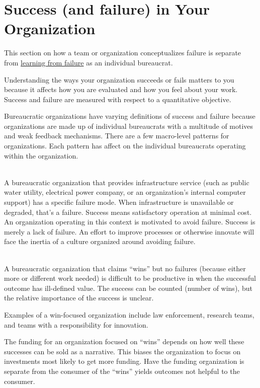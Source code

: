 \section{Success (and failure) in Your Organization\label{sec:org-failure-and-success}}

This section on how a team or organization conceptualizes failure is separate from %
\hyperref[sec:learn-from-failure]{learning from failure} as an individual bureaucrat. 

Understanding the ways your organization succeeds or fails matters to you because it affects how you are evaluated and how you feel about your work. Success and failure are measured with respect to a quantitative objective. 


Bureaucratic organizations have varying definitions of success and failure because organizations are made up of individual bureaucrats with a multitude of motives and weak feedback mechanisms. There are a few macro-level patterns for organizations. Each pattern has affect on the individual bureaucrats operating within the organization. 

\ \\

A bureaucratic organization that provides infrastructure service (such as public water utility, electrical power company, or an organization's internal computer support) has a specific failure mode. When infrastructure is unavailable or degraded, that's a failure. Success means satisfactory operation at minimal cost. An organization operating in this context is motivated to avoid failure. Success is merely a lack of failure. An effort to improve processes or otherwise innovate will face the inertia of a culture organized around avoiding failure. 

\ \\

A bureaucratic organization that claims ``wins'' but no failures (because either more or different work needed) is difficult to be productive in when the successful outcome has ill-defined value. The success can be counted (number of wins), but the relative importance of the success is unclear.

Examples of a win-focused organization include law enforcement, research teams, and teams with a responsibility for innovation. 

The funding for an organization focused on ``wins'' depends on how well these successes can be sold as a narrative. This biases the organization to focus on investments most likely to get more funding. Have the funding organization is separate from the consumer of the ``wins'' yields outcomes not helpful to the consumer.

\ \\

